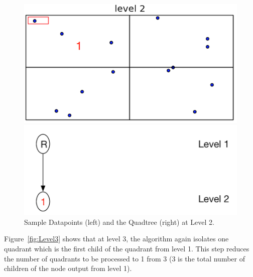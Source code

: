 \begin{figure}[H]
  \centering
  \vspace{0.5in}
  \begin{minipage}[b]{0.35\textwidth}
    \includegraphics[width=\textwidth]{Images/1_1Quad1_2}
  \end{minipage}
  \hfill
  \begin{minipage}[b]{0.5\textwidth}
    \includegraphics[width=\textwidth]{Images/1Quad_2_tree}
  \end{minipage}
  \vspace{0.5in}
  \caption{Sample Datapoints (left) and the Quadtree (right) at Level 2.}
   \label{fig:Level2}
\end{figure}

Figure~\ref{fig:Level3} shows that at level 3, the algorithm again isolates one quadrant which is the first child of the quadrant from level 1. This step reduces the number of quadrants to be processed to 1 from 3 (3 is the total number of children of the node output from level 1).

